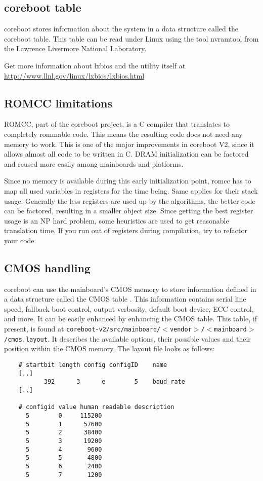 \documentclass[titlepage,12pt]{article}
\begin{document}
\subsection{coreboot table}
coreboot stores information about the system in a data structure called
the coreboot table. This table can be read under Linux using the tool
nvramtool from the Lawrence Livermore National Laboratory.

Get more information about lxbios and the utility itself at
\url{http://www.llnl.gov/linux/lxbios/lxbios.html}

\subsection{ROMCC limitations}
ROMCC, part of the coreboot project, is a C compiler that translates to
completely rommable code. This means the resulting code does not need
any memory to work. This is one of the major improvements in coreboot
V2, since it allows almost all code to be written in C. DRAM
initialization can be factored and reused more easily among mainboards
and platforms.

Since no memory is available during this early initialization point,
romcc has to map all used variables in registers for the time being.
Same applies for their stack usage.  Generally the less registers are
used up by the algorithms, the better code can be factored, resulting in
a smaller object size. Since getting the best register usage is an NP
hard problem, some heuristics are used to get reasonable translation
time. If you run out of registers during compilation, try to refactor
your code.

\subsection{CMOS handling}
coreboot can use the mainboard's CMOS memory to store information
defined in a data structure called the CMOS table . This information
contains serial line speed, fallback boot control, output verbosity,
default boot device, ECC control, and more. It can be easily enhanced by
enhancing the CMOS table. This table, if present, is found at
\texttt{coreboot-v2/src/mainboard/$<$vendor$>$/$<$mainboard$>$/cmos.layout}.
It describes the available options, their possible values and their
position within the CMOS memory. The layout file looks as follows:
\begin{verbatim}
    # startbit length config configID    name
    [..]
           392      3      e        5    baud_rate
    [..]
    
    # configid value human readable description
      5        0     115200
      5        1      57600
      5        2      38400
      5        3      19200
      5        4       9600
      5        5       4800
      5        6       2400
      5        7       1200
    
\end{verbatim}
\end{document}
